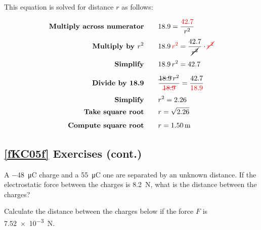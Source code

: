 \documentclass[dvipsnames]{article}
\numberwithin{equation}{section}
\numberwithin{figure}{section}
\begin{document}
This equation is solved for distance $r$ as follows:

\begin{align*}
    \textbf{Multiply across numerator} \qquad & 18.9 = \frac{\textcolor{red}{42.7}}{r^2}\\[1ex]
    \textbf{Multiply by $r^2$} \qquad & 18.9\,\textcolor{red}{r^2} = \frac{42.7}{\cancel{r^2}} \cdot \textcolor{red}{\cancel{r^2}}\\[1ex]
    \textbf{Simplify} \qquad & 18.9\,r^2 = 42.7\\[1ex]
    \textbf{Divide by 18.9} \qquad & \frac{\cancel{18.9}\,r^2}{\textcolor{red}{\cancel{18.9}}} = \frac{42.7}{\textcolor{red}{18.9}}\\[1ex]
    \textbf{Simplify} \qquad & r^2 = 2.26\\
    \textbf{Take square root} \qquad & r = \sqrt{2.26}\\[1ex]
    \textbf{Compute square root} \qquad & r = \qty{1.50}{m}\\ 
\end{align*}

\cyanhrule

\subsection*{\ref{fKC05f} Exercises (cont.)}

\begin{exercise} \label{clmO0M}
    A \SI{-48}{\micro C} charge and a \SI{55}{\micro C} one are separated by an unknown distance. If the electrostatic force between the charges is \SI{8.2}{N}, what is the distance between the charges?
\end{exercise}

\begin{exercise} \label{TrRzFe}
Calculate the distance between the charges below if the force $F$ is \qty{7.52e-3}{N}.

\begin{center}
\end{center}
\end{exercise}
\end{document}
